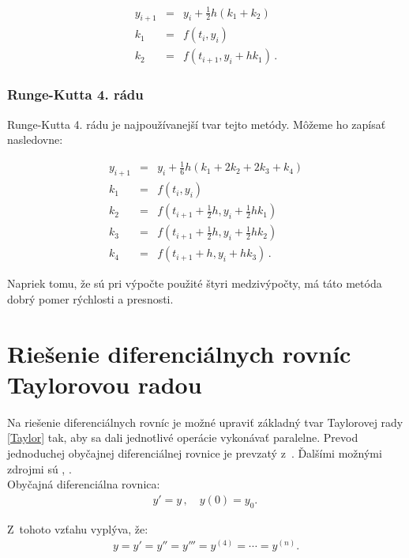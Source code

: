 \begin{eqnarray}
y_{i+1} & = & y_{i} + \frac{1}{2}h(k_{1} + k_{2}) \\
k_{1} & = & f(t_{i},y_{i}) \nonumber \\
k_{2} & = & f(t_{i+1}, y_{i} + hk_{1}) \, . \nonumber
\end{eqnarray}


\newpage
\subsection{Runge-Kutta 4. rádu} \label{RK4}
Runge-Kutta 4. rádu je najpoužívanejší tvar tejto metódy. Môžeme ho zapísať nasledovne:

\begin{eqnarray}
y_{i+1} & = & y_{i} + \frac{1}{6}h(k_{1} + 2k_{2} + 2k_{3} + k_{4}) \\
k_{1} & = & f(t_{i},y_{i}) \nonumber \\
k_{2} & = & f(t_{i+1} + \frac{1}{2}h, y_{i} + \frac{1}{2}hk_{1}) \nonumber \\
k_{3} & = & f(t_{i+1} + \frac{1}{2}h, y_{i} + \frac{1}{2}hk_{2}) \nonumber \\
k_{4} & = & f(t_{i+1} + h, y_{i} + hk_{3}) \, . \nonumber
\end{eqnarray}

Napriek tomu, že sú pri výpočte použité štyri medzivýpočty, má táto metóda dobrý pomer rýchlosti a presnosti.


\chapter{Riešenie diferenciálnych rovníc Taylorovou radou} \label{SOLUTION_WITH_TAYLOR}
Na riešenie diferenciálnych rovníc je možné upraviť základný tvar Taylorovej rady \eqref{Taylor} tak, aby sa dali jednotlivé operácie vykonávať paralelne. Prevod jednoduchej obyčajnej diferenciálnej rovnice je prevzatý z~\cite{MatecnyBP}. Ďalšími možnými zdrojmi sú \cite{OpalkaDP}, \cite{KrausDisP}. \\

Obyčajná diferenciálna rovnica:
\begin{eqnarray}
y' = y \, , \quad y(0) = y_{0}. \, \label{jednoducha_rovnica}
\end{eqnarray}

Z~tohoto vzťahu vyplýva, že:
\begin{eqnarray}
y = y' = y'' = y''' = y^{(4)} =\cdots = y^{(n)} .
\end{eqnarray}

